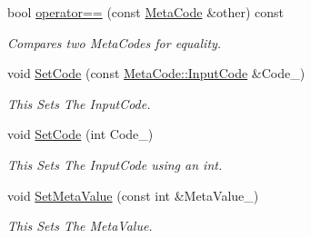 \begin{DoxyCompactItemize}
bool \hyperlink{classphys_1_1MetaCode_a506486e5a6f08d50a5af42fa6d48a7f5}{operator==} (const \hyperlink{classphys_1_1MetaCode}{MetaCode} \&other) const 
\begin{DoxyCompactList}\small\item\em Compares two MetaCodes for equality. \item\end{DoxyCompactList}\item 
void \hyperlink{classphys_1_1MetaCode_ab6759fbee9d039cf248bf76dde0f33dd}{SetCode} (const \hyperlink{classphys_1_1MetaCode_a3e501cbb5bf0f6f1fdb7211465bda8d8}{MetaCode::InputCode} \&Code\_\-)
\begin{DoxyCompactList}\small\item\em This Sets The InputCode. \item\end{DoxyCompactList}\item 
void \hyperlink{classphys_1_1MetaCode_a26dd1a0b3b099b080fade8e33e9dde70}{SetCode} (int Code\_\-)
\begin{DoxyCompactList}\small\item\em This Sets The InputCode using an int. \item\end{DoxyCompactList}\item 
void \hyperlink{classphys_1_1MetaCode_a31a6390626b08c1bbf08e3f68d2ea764}{SetMetaValue} (const int \&MetaValue\_\-)
\begin{DoxyCompactList}\small\item\em This Sets The MetaValue. \item\end{DoxyCompactList}\end{DoxyCompactItemize}
